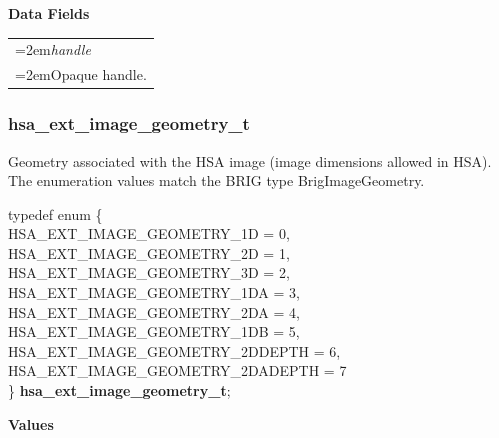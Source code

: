 \documentclass[final,oneside]{book}
\newcommand{\reffld}[1]{\textit{#1}}
\newcommand{\reftyp}[1]{#1}
\newcommand{\refenu}[1]{\reftyp{#1}}
\newenvironment{mylongtable}{\rowcolors{0}{lightgray}{lightgray}\longtable} {
\endlongtable}
\begin{document}
\noindent\textbf{Data Fields}\\[-7mm]
\begin{longtable}{@{}>{\hangindent=2em}p{\textwidth}}
\hypertarget{hsa_\-ext_\-image_\-t.handle}{\reffld{handle}}\\\hspace{2em}Opaque handle.
\end{longtable}



\subsubsection{hsa_\-ext_\-image_\-geometry_\-t}
\vspace{-2.5mm}Geometry associated with the HSA image (image dimensions allowed in HSA). The enumeration values match the BRIG type BrigImageGeometry.\begin{mylongtable}{@{}p{\textwidth}}
\rule{0pt}{3ex}typedef enum \{\\\hspace{1.7em}\hypertarget{group__ext-images_1ggac61587d98a80d1660378e3904a66fc9caa025ea993dbfe3101d3ff0caea2ea0cf}{\refenu{HSA_\-EXT_\-IMAGE_\-GEOMETRY_\-1D}} = 0,\\
\hspace{1.7em}\hypertarget{group__ext-images_1ggac61587d98a80d1660378e3904a66fc9ca4bcc28ccad5a32bd9c9dbf203da4464e}{\refenu{HSA_\-EXT_\-IMAGE_\-GEOMETRY_\-2D}} = 1,\\
\hspace{1.7em}\hypertarget{group__ext-images_1ggac61587d98a80d1660378e3904a66fc9ca2e749b6b96377b9a744fc837296e318c}{\refenu{HSA_\-EXT_\-IMAGE_\-GEOMETRY_\-3D}} = 2,\\
\hspace{1.7em}\hypertarget{group__ext-images_1ggac61587d98a80d1660378e3904a66fc9cad989c8e619b376dc98ac3950be9afa33}{\refenu{HSA_\-EXT_\-IMAGE_\-GEOMETRY_\-1DA}} = 3,\\
\hspace{1.7em}\hypertarget{group__ext-images_1ggac61587d98a80d1660378e3904a66fc9ca90929e69cbf0b447060e1aeb23fd6dd4}{\refenu{HSA_\-EXT_\-IMAGE_\-GEOMETRY_\-2DA}} = 4,\\
\hspace{1.7em}\hypertarget{group__ext-images_1ggac61587d98a80d1660378e3904a66fc9ca47b208990ed715c37071f1fff17e812c}{\refenu{HSA_\-EXT_\-IMAGE_\-GEOMETRY_\-1DB}} = 5,\\
\hspace{1.7em}\hypertarget{group__ext-images_1ggac61587d98a80d1660378e3904a66fc9caf1f195107c114c7235275f047d2f0474}{\refenu{HSA_\-EXT_\-IMAGE_\-GEOMETRY_\-2DDEPTH}} = 6,\\
\hspace{1.7em}\hypertarget{group__ext-images_1ggac61587d98a80d1660378e3904a66fc9caf3d5440659a9dfd7892da13c1fe992bd}{\refenu{HSA_\-EXT_\-IMAGE_\-GEOMETRY_\-2DADEPTH}} = 7\\
\} \hypertarget{group__ext-images_1gac61587d98a80d1660378e3904a66fc9c}{\textbf{hsa_\-ext_\-image_\-geometry_\-t}};\rule[-2ex]{0pt}{0pt}\end{mylongtable}\noindent\textbf{Values}\\[-7mm]
\end{document}
